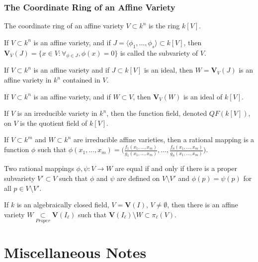 \documentclass[crop=false,class=book]{standalone}
\begin{document}
\subsubsection{The Coordinate Ring of an Affine Variety}
\begin{definition}
The coordinate ring of an affine variety $V\subset k^n$ is the ring $k[V]$.
\end{definition}
\begin{definition}
If $V\subset k^n$ is an affine variety, and if $J = \langle \phi_1,\hdots, \phi_s\rangle \subset k[V]$, then $\mathbf{V}_{V}(J) = \{x\in V:\forall_{\phi \in J}, \phi(x) = 0 \}$ is called the subvariety of $V$.
\end{definition}
\begin{theorem}
If $V\subset k^n$ is an affine variety and if $J\subset k[V]$ is an ideal, then $W = \mathbf{V}_{V}(J)$ is an affine variety in $k^n$ contained in $V$.
\end{theorem}
\begin{theorem}
If $V\subset k^n$ is an affine variety, and if $W\subset V$, then $\mathbf{V}_{V}(W)$ is an ideal of $k[V]$.
\end{theorem}
\begin{definition}
If $V$ is an irreducible variety in $k^n$, then the function field, denoted $QF(k[V])$, on $V$ is the quotient field of $k[V]$.
\end{definition}
\begin{definition}
If $V\subset k^m$ and $W\subset k^n$ are irreducible affine varieties, then a rational mapping is a function $\phi$ such that $\phi(x_1,\hdots, x_m) = \bigg(\frac{f_1(x_1,\hdots, x_m)}{g_1(x_1,\hdots, x_m)}, \hdots, \frac{f_n(x_1,\hdots, x_m)}{g_n(x_1,\hdots, x_m)}\bigg)$.
\end{definition}
\begin{theorem}
Two rational mappings $\phi,\psi:V\rightarrow W$ are equal if and only if there is a proper subvariety $V'\subset V$ such that $\phi$ and $\psi$ are defined on $V\setminus V'$ and $\phi(p) = \psi(p)$ for all $p \in V\setminus V'$.
\end{theorem}
\begin{theorem}
If $k$ is an algebraically closed field, $V=\mathbf{V}(I)$, $V\ne \emptyset$, then there is an affine variety $W\underset{Proper}\subset \mathbf{V}(I_{\ell})$ such that $\mathbf{V}(I_{\ell})\setminus W \subset \pi_{\ell}(V)$.
\end{theorem}
\section{Miscellaneous Notes}
\end{document}
